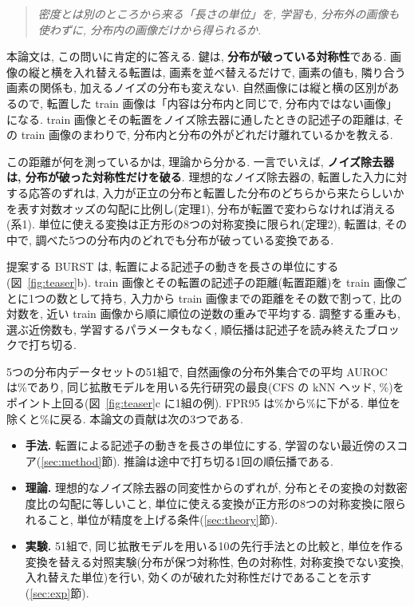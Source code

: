 \documentclass[MIRU,submit]{miru2025j}
\newcommand{\method}{BURST}                 %
\begin{document}
\begin{quote}
\textit{密度とは別のところから来る「長さの単位」を, 学習も, 分布外の画像も使わずに, 分布内の画像だけから得られるか.}
\end{quote}

本論文は, この問いに肯定的に答える. 鍵は, \textbf{分布が破っている対称性}である. 画像の縦と横を入れ替える転置は, 画素を並べ替えるだけで, 画素の値も, 隣り合う画素の関係も, 加えるノイズの分布も変えない. 自然画像には縦と横の区別があるので, 転置した train 画像は「内容は分布内と同じで, 分布内ではない画像」になる. train 画像とその転置をノイズ除去器に通したときの記述子の距離は, その train 画像のまわりで, 分布内と分布の外がどれだけ離れているかを教える.

この距離が何を測っているかは, 理論から分かる. 一言でいえば, \textbf{ノイズ除去器は, 分布が破った対称性だけを破る}. 理想的なノイズ除去器の, 転置した入力に対する応答のずれは, 入力が正立の分布と転置した分布のどちらから来たらしいかを表す対数オッズの勾配に比例し(定理1), 分布が転置で変わらなければ消える(系1). 単位に使える変換は正方形の8つの対称変換に限られ(定理2), 転置は, その中で, 調べた5つの分布内のどれでも分布が破っている変換である.

提案する \method{} は, 転置による記述子の動きを長さの単位にする(図~\ref{fig:teaser}b). train 画像とその転置の記述子の距離(転置距離)を train 画像ごとに1つの数として持ち, 入力から train 画像までの距離をその数で割って, 比の対数を, 近い train 画像から順に順位の逆数の重みで平均する. 調整する重みも, 選ぶ近傍数も, 学習するパラメータもなく, 順伝播は記述子を読み終えたブロックで打ち切る.

5つの分布内データセットの51組で, 自然画像の分布外集合での平均 AUROC は\nOursT\%であり, 同じ拡散モデルを用いる先行研究の最良(CFS の kNN ヘッド, \nPriorT\%)を\nGapPriorT{}ポイント上回る(図~\ref{fig:teaser}c に1組の例). FPR95 は\nPriorFprBestT\%から\nFprT\%に下がる. 単位を除くと\nNoUnitT\%に戻る. 本論文の貢献は次の3つである.
\begin{itemize}
\setlength{\itemsep}{0pt}\setlength{\parskip}{0pt}
\item \textbf{手法.} 転置による記述子の動きを長さの単位にする, 学習のない最近傍のスコア(\ref{sec:method}節). 推論は途中で打ち切る1回の順伝播である.
\item \textbf{理論.} 理想的なノイズ除去器の同変性からのずれが, 分布とその変換の対数密度比の勾配に等しいこと, 単位に使える変換が正方形の8つの対称変換に限られること, 単位が精度を上げる条件(\ref{sec:theory}節).
\item \textbf{実験.} 51組で, 同じ拡散モデルを用いる10の先行手法との比較と, 単位を作る変換を替える対照実験(分布が保つ対称性, 色の対称性, 対称変換でない変換, 入れ替えた単位)を行い, 効くのが破れた対称性だけであることを示す(\ref{sec:exp}節).
\end{itemize}
\end{document}
